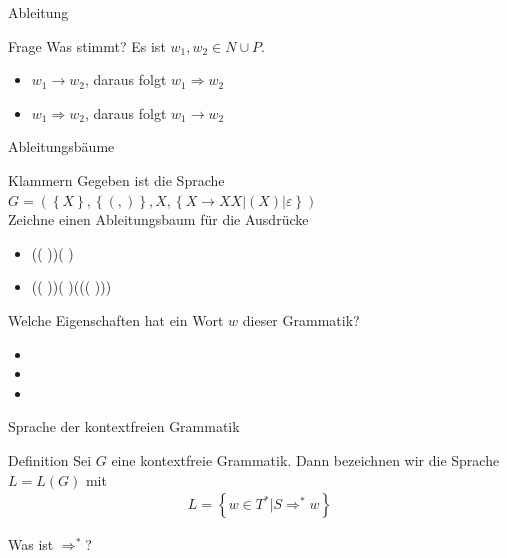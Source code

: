 \begin{frame}{Ableitung}
    \begin{block}{Frage}
        Was stimmt? Es ist $w_1, w_2 \in N \cup P$.
        \begin{itemize}
            \item $w_1 \rightarrow w_2$, daraus folgt $w_1 \Rightarrow w_2$ 
            \item $w_1 \Rightarrow w_2$, daraus folgt $w_1 \rightarrow w_2$ 
        \end{itemize}
        \pause
    \end{block}
\end{frame}

\begin{frame}{Ableitungsbäume}
    \begin{block}{Klammern}
        Gegeben ist die Sprache $G = \left( \left\{ X\right\} , \left\{ \left( ,\right) \right\} , X, \left\{ X \rightarrow XX \big| \left( X\right) \big| \varepsilon \right\} \right) $\\
        Zeichne einen Ableitungsbaum für die Ausdrücke
        \begin{itemize}
            \item (( ))( )
            \item (( ))( )((( ))) 
        \end{itemize}
        Welche Eigenschaften hat ein Wort $w$ dieser Grammatik?
        \begin{itemize}
            \item {}
            \item {}
            \item {}
        \end{itemize}
    \end{block}
\end{frame}

\begin{frame}{Sprache der kontextfreien Grammatik}
    \begin{block}{Definition}
        Sei $G$ eine kontextfreie Grammatik. Dann bezeichnen wir die Sprache $L = L\left(G\right)$ mit 
        \begin{align*}
            L = \left\{ w\in T^* \big| S \Rightarrow^* w\right\}
        \end{align*}
    \end{block}
    \pause
    \begin{block}{Was ist $\Rightarrow^*$?}\pause
    \end{block}
\end{frame}

